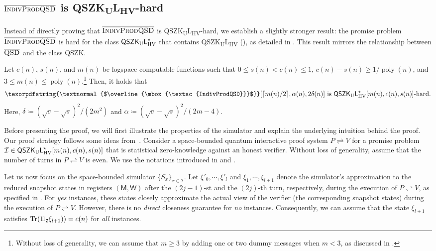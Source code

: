 \documentclass[10pt,a4paper]{article}
\numberwithin{equation}{section}
\numberwithin{figure}{section}
\newcommand{\QSZK}{\textnormal{\textsf{QSZK}}\xspace}
\newcommand{\QSZKULHV}{\texorpdfstring{\textnormal{\textsf{QSZK}\textsubscript{\textnormal{U}}\textsf{L}}\textsubscript{\textnormal{HV}}}\xspace}
\newcommand{\QSZKULstar}{\mathsf{QSZK_{\textnormal{U}}L}^{\star}_{\mathrm{HV}}}
\newcommand{\protocol}[2]{{#1}\!\rightleftharpoons\!{#2}}
\newcommand{\textoverline}[1]{$\overline{\mbox{#1}}$}
\newcommand{\coQSD}{\texorpdfstring{\textnormal{\textoverline{\textsc{QSD}}}}\xspace}
\newcommand{\coIndivProdQSD}{\texorpdfstring{\textnormal{\textoverline{\textsc{IndivProdQSD}}}}\xspace}
\DeclarePairedDelimiter\rbra{\lparen}{\rparen}
\DeclarePairedDelimiter\sbra{\lbrack}{\rbrack}
\DeclarePairedDelimiter\ceil{\lceil}{\rceil}
\let\ket\relax\DeclarePairedDelimiter\ket{\lvert}{\rangle}
\let\bra\relax\DeclarePairedDelimiter\bra{\langle}{\rvert}
\newcommand{\ketbra}[2]{\ensuremath{\ket{#1}\!\bra{#2}}}
\newcommand{\Tr}{\mathrm{Tr}}
\DeclareMathOperator\poly{poly}
\newcommand{\calI}{\mathcal{I}}
\newcommand{\sfM}{\mathsf{M}}
\newcommand{\sfW}{\mathsf{W}}
\newcommand{\ttZ}{\mathtt{Z}}
\begin{document}
\subsection{\coIndivProdQSD{} is \QSZKULHV{}-hard}
\label{subsec:IndivProdQSD-QSZKLhard}

Instead of directly proving that \coIndivProdQSD{} is \QSZKULHV{}-hard, we establish a slightly stronger result: the promise problem \coIndivProdQSD{} is hard for the class $\QSZKULstar$ that contains \QSZKULHV{} (), as detailed in . This result mirrors the relationship between \coQSD{} and the class \QSZK{}. 
\begin{theorem}[\coIndivProdQSD{} is $\QSZKULstar$-hard]
    \label{thm:IndivProdQSD-QSZKLhard}
    Let $c(n)$, $s(n)$, and $m(n)$ be logspace computable functions such that $0 \leq s(n) < c(n) \leq 1$, $c(n) - s(n) \geq 1/\poly(n)$, and $3 \leq m(n) \leq \poly(n)$.\footnote{Without loss of generality, we can assume that $m \geq 3$ by adding one or two dummy messages when $m < 3$, as discussed in .} Then, it holds that 
    \[ \coIndivProdQSD\sbra*{\ceil*{m(n)/2}, \alpha(n), 2\delta(n)} \text{ is } \QSZKULstar[m(n),c(n),s(n)]\text{-hard}.\]
    Here, $\delta \coloneqq (\sqrt{c}-\sqrt{s})^2/(2m^2)$ and $\alpha \coloneqq (\sqrt{c}-\sqrt{s})^2/(2m-4)$. 
\end{theorem}

Before presenting the proof, we will first illustrate the properties of the simulator and explain the underlying intuition behind the proof. Our proof strategy follows some ideas from~\cite[Section 5]{Wat02QSZK}. Consider a space-bounded quantum interactive proof system $\protocol{P}{V}$ for a promise problem $\calI \in \QSZKULstar[m(n),c(n),s(n)]$ that is statistical zero-knowledge against an honest verifier. Without loss of generality, assume that the number of turns in $\protocol{P}{V}$ is even. We use the notations introduced in  and . 

Let us now focus on the space-bounded simulator $\{S_x\}_{x\in\calI}$. Let $\xi'_0,\cdots,\xi'_l$ and $\xi_1,\cdots,\xi_{l+1}$ denote the simulator's approximation to the reduced snapshot states in registers $(\sfM,\sfW)$ after the $(2j-1)$-st and the $(2j)$-th turn, respectively, during the execution of $\protocol{P}{V}$, as specified in . For \textit{yes} instances, these states closely approximate the actual view of the verifier (the corresponding snapshot states) during the execution of $\protocol{P}{V}$. However, there is no \textit{direct} closeness guarantee for \textit{no} instances. Consequently, we can assume that the state $\xi_{l+1}$ satisfies $\Tr\rbra*{\ketbra{1}{1}_{\ttZ} \xi_{l+1})} = c(n)$ for \textit{all} instances. 
\end{document}

